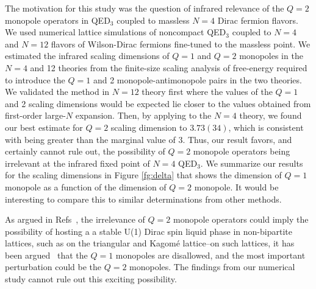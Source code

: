 \documentclass[prd, onecolumn, superscriptaddress, nofootinbib, notitlepage, floatfix]{revtex4-1}
\newcommand\fgn[1]{Figure \ref{fg:#1}}
\begin{document}
The motivation for this study was the question of infrared relevance
of the $Q=2$ monopole operators in QED$_3$ coupled
to massless $N=4$ Dirac fermion flavors.  We used numerical lattice
simulations of noncompact QED$_3$ coupled to $N=4$ and $N=12$ flavors
of Wilson-Dirac fermions fine-tuned to the massless point. We
estimated the infrared scaling dimensions of $Q=1$ and $Q=2$ monopoles
in the $N=4$ and 12 theories from the finite-size scaling analysis
of free-energy required to introduce the $Q=1$ and 2 monopole-antimonopole
pairs in the two theories.  We validated the method in $N=12$ theory
first where the values of the $Q=1$ and 2 scaling dimensions would
be expected lie closer to the values obtained from first-order
large-$N$ expansion. Then, by applying to the $N=4$ theory, we found
our best estimate for $Q=2$ scaling dimension to $3.73(34)$, which
is consistent with being greater than the marginal value of $3$.
Thus, our result favors, and certainly cannot rule out, the possibility
of $Q=2$ monopole operators being irrelevant at the infrared fixed
point of $N=4$ QED$_3$.  We summarize our results for the scaling
dimensions in \fgn{delta} that shows the dimension of $Q=1$ monopole
as a function of the dimension of $Q=2$ monopole. It would be
interesting to compare this to similar determinations
from other methods.

As argued in Refs~\cite{Song:2018ial,Song:2018ccm}, the irrelevance
of $Q=2$ monopole operators could imply the possibility of hosting
a a stable U(1) Dirac spin liquid phase in non-bipartite lattices, such
as on the triangular and Kagom\'e lattice--on such lattices, it has
been argued~\cite{Song:2018ial,Song:2018ial} that the $Q=1$ monopoles
are disallowed, and the most important perturbation could be the
$Q=2$ monopoles.  The findings from our numerical study cannot rule
out this exciting possibility.


\end{document}

